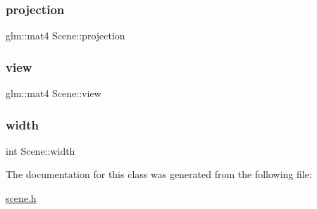 \mbox{\label{class_scene_a866fbd2d4a47a2e78675f8c16da96b6e}} 
\subsubsection{\texorpdfstring{projection}{projection}}
{\footnotesize\ttfamily glm\+::mat4 Scene\+::projection\hspace{0.3cm}{\ttfamily [protected]}}

\mbox{\label{class_scene_a0f02dd92fafa0ad6e820afb9214393c2}} 
\subsubsection{\texorpdfstring{view}{view}}
{\footnotesize\ttfamily glm\+::mat4 Scene\+::view\hspace{0.3cm}{\ttfamily [protected]}}

\mbox{\label{class_scene_a99ea310cee6775f4f5bef1940e647cf1}} 
\subsubsection{\texorpdfstring{width}{width}}
{\footnotesize\ttfamily int Scene\+::width}



The documentation for this class was generated from the following file\+:\begin{DoxyCompactItemize}
\item 
\mbox{\hyperlink{scene_8h}{scene.\+h}}\end{DoxyCompactItemize}
